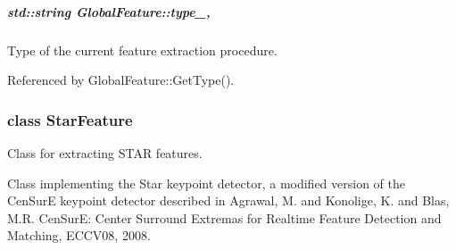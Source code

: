 \hypertarget{group___feature_extractor_ad467857c4bc3d0fe65ba29e3b8f7c796}{
\subparagraph[{type\-\_\-}]{\setlength{\rightskip}{0pt plus 5cm}std\-::string Global\-Feature\-::type\-\_\-\hspace{0.3cm}{\ttfamily [protected]}, {\ttfamily [inherited]}}}\label{group___feature_extractor_ad467857c4bc3d0fe65ba29e3b8f7c796}


Type of the current feature extraction procedure. 



Referenced by Global\-Feature\-::\-Get\-Type().

\label{class_star_feature}
\hypertarget{group___feature_extractor_class_star_feature}{}
\subsubsection{class Star\-Feature}
Class for extracting S\-T\-A\-R features. 

Class implementing the Star keypoint detector, a modified version of the Cen\-Sur\-E keypoint detector described in Agrawal, M. and Konolige, K. and Blas, M.\-R. \-Cen\-Sur\-E\-: Center Surround Extremas for Realtime Feature Detection and Matching, E\-C\-C\-V08, 2008. 

